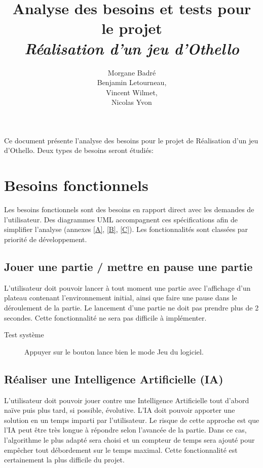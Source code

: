 \documentclass[a4paper,12pt]{article}
\begin{document}
\title{Analyse des besoins et tests pour le projet\\
  \textit{Réalisation d'un jeu d'Othello}}

\author{Morgane Badré\\
  Benjamin Letourneau,\\
  Vincent Wilmet,\\
  Nicolas Yvon\\}
\date{}

\maketitle

Ce document présente l'analyse des besoins pour le projet de Réalisation d'un jeu d'Othello. Deux types de besoins seront étudiés:

\section{Besoins fonctionnels}

Les besoins fonctionnels sont des besoins en rapport direct avec les
demandes de l'utilisateur. Des diagrammes UML accompagnent ces
spécifications afin de simplifier l'analyse (annexes \ref{A}, \ref{B},
\ref{C}). Les fonctionnalités sont classées par priorité de développement.

\subsection{Jouer une partie / mettre en pause une partie}
L’utilisateur doit pouvoir lancer à tout moment une partie avec l'affichage d'un plateau contenant l’environnement initial, ainsi que faire une pause dans le déroulement de la partie. Le lancement d'une partie ne doit pas prendre plus de 2 secondes. Cette fonctionnalité ne sera pas difficile à implémenter.

\begin{description}
\item[Test système] Appuyer sur le bouton lance bien le mode Jeu du logiciel.
\end{description}

\subsection{Réaliser une Intelligence Artificielle (IA) }
\label{IA}
L'utilisateur doit pouvoir jouer contre une Intelligence Artificielle tout d'abord naïve puis plus tard, si possible, évolutive. L'IA doit pouvoir apporter une solution en un temps imparti par l'utilisateur. Le risque de cette approche est que l'IA peut être très longue à répondre selon l'avancée de la partie. Dans ce cas, l'algorithme le plus adapté sera choisi et un compteur de temps sera ajouté pour empêcher tout débordement sur le temps maximal. Cette fonctionnalité est certainement la plus difficile du projet.
\end{document}
